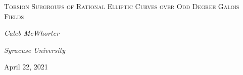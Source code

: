 
{ 

\begin{frame}[plain] \vspace{1.8cm}
\begin{center}
\phantom{.}\par
	{\Large\color{UniOrange} \textsc{Torsion Subgroups of}  \textsc{Rational Elliptic Curves over}  \textsc{Odd Degree Galois Fields}} \par\vspace{0.2cm}

	{\large\color{UniGray}\textit{Caleb McWhorter} \par
	\textit{Syracuse University}} \par\vspace{1.8cm}
	
	{\small\color{UniGray} April 22, 2021}
\end{center}
\end{frame}
}





